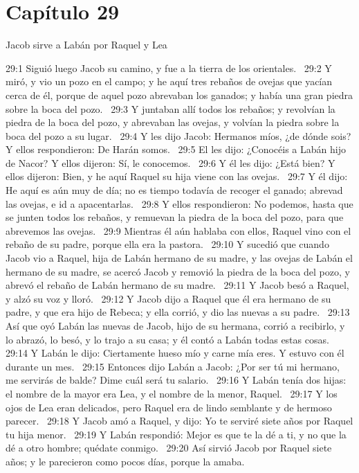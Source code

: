 \section*{Capítulo 29}
Jacob sirve a Labán por Raquel y Lea  

29:1 Siguió luego Jacob su camino, y fue a la tierra de los orientales.  
29:2 Y miró, y vio un pozo en el campo; y he aquí tres rebaños de ovejas que yacían cerca de él, porque de aquel pozo abrevaban los ganados; y había una gran piedra sobre la boca del pozo.  
29:3 Y juntaban allí todos los rebaños; y revolvían la piedra de la boca del pozo, y abrevaban las ovejas, y volvían la piedra sobre la boca del pozo a su lugar.  
29:4 Y les dijo Jacob: Hermanos míos, ¿de dónde sois? Y ellos respondieron: De Harán somos.  
29:5 El les dijo: ¿Conocéis a Labán hijo de Nacor? Y ellos dijeron: Sí, le conocemos.  
29:6 Y él les dijo: ¿Está bien? Y ellos dijeron: Bien, y he aquí Raquel su hija viene con las ovejas.  
29:7 Y él dijo: He aquí es aún muy de día; no es tiempo todavía de recoger el ganado; abrevad las ovejas, e id a apacentarlas.  
29:8 Y ellos respondieron: No podemos, hasta que se junten todos los rebaños, y remuevan la piedra de la boca del pozo, para que abrevemos las ovejas.  
29:9 Mientras él aún hablaba con ellos, Raquel vino con el rebaño de su padre, porque ella era la pastora.  
29:10 Y sucedió que cuando Jacob vio a Raquel, hija de Labán hermano de su madre, y las ovejas de Labán el hermano de su madre, se acercó Jacob y removió la piedra de la boca del pozo, y abrevó el rebaño de Labán hermano de su madre.  
29:11 Y Jacob besó a Raquel, y alzó su voz y lloró.  
29:12 Y Jacob dijo a Raquel que él era hermano de su padre, y que era hijo de Rebeca; y ella corrió, y dio las nuevas a su padre.  
29:13 Así que oyó Labán las nuevas de Jacob, hijo de su hermana, corrió a recibirlo, y lo abrazó, lo besó, y lo trajo a su casa; y él contó a Labán todas estas cosas.  
29:14 Y Labán le dijo: Ciertamente hueso mío y carne mía eres. Y estuvo con él durante un mes.  
29:15 Entonces dijo Labán a Jacob: ¿Por ser tú mi hermano, me servirás de balde? Dime cuál será tu salario.  
29:16 Y Labán tenía dos hijas: el nombre de la mayor era Lea, y el nombre de la menor, Raquel.  
29:17 Y los ojos de Lea eran delicados, pero Raquel era de lindo semblante y de hermoso parecer.  
29:18 Y Jacob amó a Raquel, y dijo: Yo te serviré siete años por Raquel tu hija menor.  
29:19 Y Labán respondió: Mejor es que te la dé a ti, y no que la dé a otro hombre; quédate conmigo.  
29:20 Así sirvió Jacob por Raquel siete años; y le parecieron como pocos días, porque la amaba.  
